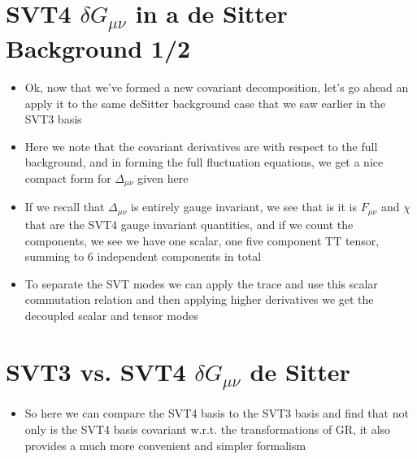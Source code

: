 \documentclass[10pt,letterpaper]{article}
\numberwithin{equation}{section}
\begin{document}
\section{SVT4 $\delta G_{\mu\nu}$ in a de Sitter Background 1/2}
\begin{itemize}
	\item Ok, now that we've formed a new covariant decomposition, let's go ahead an apply it to the same deSitter background case that we saw earlier in the SVT3 basis
	\item Here we note that the covariant derivatives are with respect to the full background, and in forming the full fluctuation equations, we get a nice compact form for $\Delta_{\mu\nu}$ given here
	\item If we recall that $\Delta_{\mu\nu}$ is entirely gauge invariant, we see that is it is $F_{\mu\nu}$ and $\chi$ that are the SVT4 gauge invariant quantities, and if we count the components, we see we have one scalar, one five component TT tensor, summing to 6 independent components in total
	\item To separate the SVT modes we can apply the trace and use this scalar commutation relation and then applying higher derivatives we get the decoupled scalar and tensor modes
\end{itemize}


\section{SVT3 vs. SVT4 $\delta G_{\mu\nu}$ de Sitter}
\begin{itemize}
	\item So here we can compare the SVT4 basis to the SVT3 basis and find that not only is the SVT4 basis covariant w.r.t. the transformations of GR, it also provides a much more convenient and simpler formalism
\end{itemize}

\end{document}
